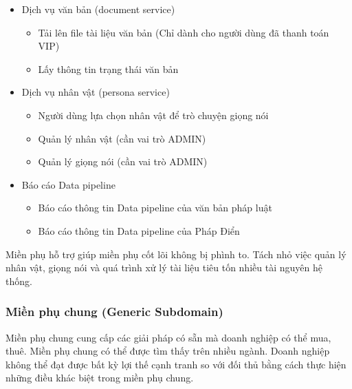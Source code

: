 \begin{itemize}


\item Dịch vụ văn bản (document service)
\begin{itemize}
\item Tải lên file tài liệu văn bản (Chỉ dành cho người dùng đã thanh toán VIP)
\item Lấy thông tin trạng thái văn bản
\end{itemize}
\item Dịch vụ nhân vật (persona service)
\begin{itemize}
\item Người dùng lựa chọn nhân vật để trò chuyện giọng nói
\item Quản lý nhân vật (cần vai trò ADMIN)
\item Quản lý giọng nói (cần vai trò ADMIN)
\end{itemize}
\item Báo cáo Data pipeline
\begin{itemize}
\item Báo cáo thông tin Data pipeline của văn bản pháp luật
\item Báo cáo thông tin Data pipeline của Pháp Điển
\end{itemize}


\end{itemize}


Miền phụ hỗ trợ giúp miền phụ cốt lõi không bị phình to.
Tách nhỏ việc quản lý nhân vật, giọng nói
và quá trình xử lý tài liệu tiêu tốn nhiều tài nguyên hệ thống.

\subsubsection{Miền phụ chung (Generic Subdomain)}

Miền phụ chung
cung cấp các giải pháp có sẵn
mà doanh nghiệp có thể mua, thuê.
Miền phụ chung
có thể được tìm thấy trên nhiều ngành.
Doanh nghiệp không thể đạt được bất kỳ lợi thế cạnh tranh so
với đối thủ bằng cách thực hiện những điều khác biệt trong miền phụ chung.


